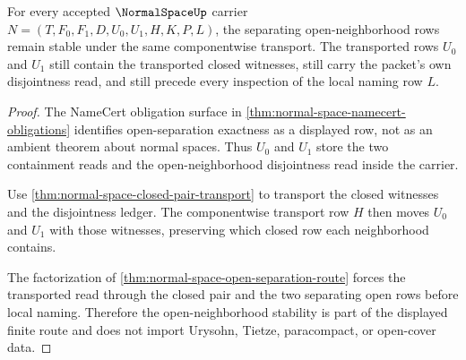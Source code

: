 \begin{theorem}
\label{thm:normal-space-open-neighborhood-stability}
For every accepted $\NormalSpaceUp$ carrier $N=(T,F_0,F_1,D,U_0,U_1,H,K,P,L)$, the separating open-neighborhood rows remain stable under the same componentwise transport. The transported rows $U_0$ and $U_1$ still contain the transported closed witnesses, still carry the packet's own disjointness read, and still precede every inspection of the local naming row $L$.
\end{theorem}
\begin{proof}
The NameCert obligation surface in \autoref{thm:normal-space-namecert-obligations} identifies open-separation exactness as a displayed row, not as an ambient theorem about normal spaces. Thus $U_0$ and $U_1$ store the two containment reads and the open-neighborhood disjointness read inside the carrier.

Use \autoref{thm:normal-space-closed-pair-transport} to transport the closed witnesses and the disjointness ledger. The componentwise transport row $H$ then moves $U_0$ and $U_1$ with those witnesses, preserving which closed row each neighborhood contains.

The factorization of \autoref{thm:normal-space-open-separation-route} forces the transported read through the closed pair and the two separating open rows before local naming. Therefore the open-neighborhood stability is part of the displayed finite route and does not import Urysohn, Tietze, paracompact, or open-cover data.
\end{proof}

